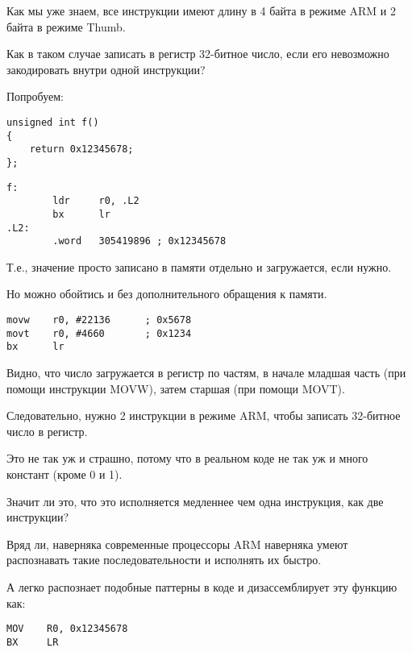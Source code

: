 ﻿
\label{ARM_big_constants}

\label{ARM_big_constants_loading}

Как мы уже знаем, все инструкции имеют длину в 4 байта в режиме ARM и 2 байта в режиме Thumb.

Как в таком случае записать в регистр 32-битное число, если его невозможно закодировать
внутри одной инструкции?

Попробуем:

\begin{lstlisting}
unsigned int f()
{
	return 0x12345678;
};
\end{lstlisting}

\begin{lstlisting}[caption=GCC 4.6.3 -O3 \ARMMode]
f:
        ldr     r0, .L2
        bx      lr
.L2:
        .word   305419896 ; 0x12345678
\end{lstlisting}

Т.е., значение  просто записано в памяти отдельно и загружается, если нужно.

Но можно обойтись и без дополнительного обращения к памяти.

\begin{lstlisting}[caption=GCC 4.6.3 -O3 -march{=}armv7-a (\ARMMode)]
movw    r0, #22136      ; 0x5678
movt    r0, #4660       ; 0x1234
bx      lr
\end{lstlisting}

Видно, что число загружается в регистр по частям, в начале младшая часть 
(при помощи инструкции MOVW), затем старшая (при помощи MOVT).

Следовательно, нужно 2 инструкции в режиме ARM, чтобы записать 32-битное число в регистр.

Это не так уж и страшно, потому что в реальном коде не так уж и много констант (кроме 0 и 1).

Значит ли это, что это исполняется медленнее чем одна инструкция, как две инструкции?

Вряд ли, наверняка современные процессоры ARM наверняка умеют распознавать такие 
последовательности и исполнять их быстро.

А \IDA легко распознает подобные паттерны в коде и дизассемблирует эту функцию как:

\begin{lstlisting}
MOV    R0, 0x12345678
BX     LR
\end{lstlisting}

